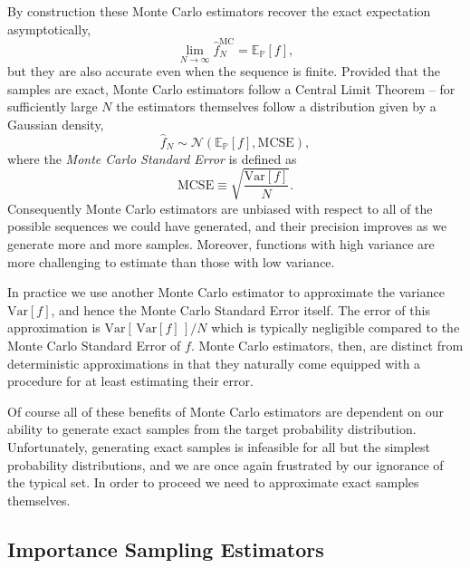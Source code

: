 \documentclass[11pt, oneside]{article}
\newcommand{\PP}{ \mathbb{P} }
\newcommand{\EE}{ \mathbb{E} }
\begin{document}
By construction these Monte Carlo estimators recover the exact
expectation asymptotically,
%
\begin{equation*}
\lim_{N \rightarrow \infty} \hat{f}^{\mathrm{MC}}_{N}
=
\EE_{\PP} [ f ],
\end{equation*}
%
but they are also accurate even when the sequence is finite.
Provided that the samples are exact, Monte Carlo estimators 
follow a Central Limit Theorem -- for sufficiently large $N$ the 
estimators themselves follow a distribution given by a Gaussian 
density,
%
\begin{equation*}
\hat{f}_{N} \sim 
\mathcal{N} \! \left( \EE_{\PP} [ f ],
\mathrm{MCSE} \right),
\end{equation*}
%
where the \emph{Monte Carlo Standard Error} is defined as
%
\begin{equation*}
\mathrm{MCSE } \equiv \sqrt{ \frac{ \mathrm{Var} [ f ] }{N} }.
\end{equation*}
%
Consequently Monte Carlo estimators are unbiased with respect
to all of the possible sequences we could have generated, and 
their precision improves as we generate more and more samples.
Moreover, functions with high variance are more challenging to
estimate than those with low variance.

In practice we use another Monte Carlo estimator to approximate the
variance $\mathrm{Var} [ f ] $, and hence the Monte Carlo Standard
Error itself.  The error of this approximation is $\mathrm{Var} [ \,
\mathrm{Var} [ f ]  \, ] / N$ which is typically negligible compared to
the Monte Carlo Standard Error of $f$.  Monte Carlo estimators, then,
are distinct from deterministic approximations in that they naturally
come equipped with a procedure for at least estimating their error.

Of course all of these benefits of Monte Carlo estimators are dependent 
on our ability to generate exact samples from the target probability 
distribution.  Unfortunately, generating exact samples is infeasible for all 
but the simplest probability distributions, and we are once again frustrated 
by our ignorance of the typical set.  In order to proceed we need to 
approximate exact samples themselves.

\subsection{Importance Sampling Estimators}
\end{document}
